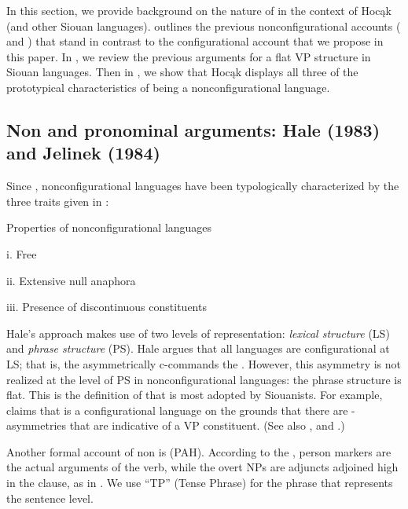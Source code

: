 \documentclass[output=paper]{LSP/langsci}
\begin{document}
In this section, we provide background on the nature of  in the context of Hocąk (and other Siouan languages).  outlines the previous nonconfigurational accounts (\citealt{Hale1983} and \citealt{Jelinek1984}) that stand in contrast to the configurational account that we propose in this paper. In , we review the previous arguments for a flat VP structure in Siouan languages. Then in , we show that Hocąk displays all three of the prototypical characteristics of being a nonconfigurational language.

\subsection{Non and pronominal arguments:  Hale (1983) and Jelinek (1984)}\label{sec:jrs:2.1}

Since \citet{Hale1983}, nonconfigurational languages have been typologically characterized by the three traits given in :

\begin{exe}
\ex\label{ex:jrs:3} Properties of nonconfigurational languages

	i.	Free 

	ii.	Extensive null anaphora

	iii.	Presence of discontinuous constituents
\end{exe}

Hale's approach makes use of two levels of representation: \textit{lexical structure} (LS) and \textit{phrase structure} (PS). Hale argues that all languages are configurational at LS; that is, the  asymmetrically c-commands the . However, this asymmetry is not realized at the level of PS in nonconfigurational languages: the phrase structure is flat. This is the definition of  that is most adopted by Siouanists. For example, \citet{Boyle2007} claims that  is a configurational language on the grounds that there are - asymmetries that are indicative of a VP constituent. (See also  \citealt{VanValin1985,VanValin1987,Williamson1984}, and \citealt{West2003}.) 

	Another formal account of non is  \textit{} (PAH). According to the , person markers are the actual arguments of the verb, while the overt NPs are adjuncts adjoined high in the clause, as in . We use ``TP'' (Tense Phrase) for the phrase that represents the sentence level.
\end{document}
